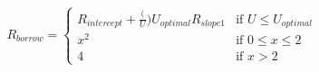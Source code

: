 \documentclass[preview]{standalone}
\begin{document}
\begin{align*}
{R_{borrow} = \begin{cases} R_{intercept} + \frac(U){U_{optimal}}R_{slope1} & \text{if } U \leq U_{optimal} \\ x^2 & \text{if } 0 \leq x \leq 2 \\ 4 & \text{if } x > 2 \end{cases}}
\end{align*}
\end{document}
